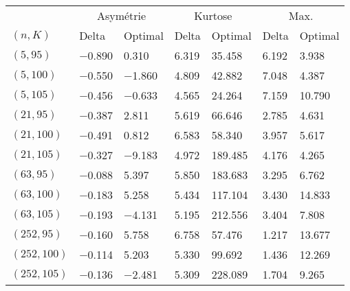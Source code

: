 \begin{tabular}{lllllll}
\toprule
& \multicolumn{2}{c}{Asymétrie} & \multicolumn{2}{c}{Kurtose} & \multicolumn{2}{c}{Max.}\\
$(n,K)$& Delta & Optimal & Delta & Optimal & Delta & Optimal\\
\midrule
$(5,95)$ & \num{-0.890} & \num{0.310} & \num{6.319} & \num{35.458} & \num{6.192} & \num{3.938}\\
$(5,100)$ & \num{-0.550} & \num{-1.860} & \num{4.809} & \num{42.882} & \num{7.048} & \num{4.387}\\
$(5,105)$ & \num{-0.456} & \num{-0.633} & \num{4.565} & \num{24.264} & \num{7.159} & \num{10.790}\\
$(21,95)$ & \num{-0.387} & \num{2.811} & \num{5.619} & \num{66.646} & \num{2.785} & \num{4.631}\\
$(21,100)$ & \num{-0.491} & \num{0.812} & \num{6.583} & \num{58.340} & \num{3.957} & \num{5.617}\\
$(21,105)$ & \num{-0.327} & \num{-9.183} & \num{4.972} & \num{189.485} & \num{4.176} & \num{4.265}\\
$(63,95)$ & \num{-0.088} & \num{5.397} & \num{5.850} & \num{183.683} & \num{3.295} & \num{6.762}\\
$(63,100)$ & \num{-0.183} & \num{5.258} & \num{5.434} & \num{117.104} & \num{3.430} & \num{14.833}\\
$(63,105)$ & \num{-0.193} & \num{-4.131} & \num{5.195} & \num{212.556} & \num{3.404} & \num{7.808}\\
$(252,95)$ & \num{-0.160} & \num{5.758} & \num{6.758} & \num{57.476} & \num{1.217} & \num{13.677}\\
$(252,100)$ & \num{-0.114} & \num{5.203} & \num{5.330} & \num{99.692} & \num{1.436} & \num{12.269}\\
$(252,105)$ & \num{-0.136} & \num{-2.481} & \num{5.309} & \num{228.089} & \num{1.704} & \num{9.265}\\
\bottomrule
\end{tabular}
\\[3em]
